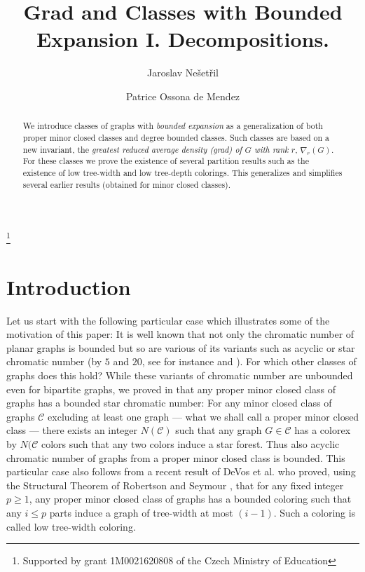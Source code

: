 \documentclass[a4paper]{amsart}
\theoremstyle{definition}
\theoremstyle{remark}
\newcommand{\rdens}[1]{\nabla_{#1}}
\begin{document}
\title{Grad  and Classes with Bounded Expansion I. Decompositions.}
\author{Jaroslav Ne\v
  set\v ril}
\thanks{Supported by grant 1M0021620808 of the Czech Ministry of Education}
\address{Department of Applied Mathematics\\
  and\\
  Institute of Theoretical Computer Science (ITI)\\
  Charles University\\
  Malostransk\' e n\' am.25, 11800 Praha 1\\
  Czech Republic}  \author{Patrice
  Ossona de Mendez}
\address{Centre d'Analyse et de Math\'ematiques Sociales\\
  CNRS, UMR 8557\\
  54 Bd Raspail, 75006 Paris\\
  France} 
\begin{abstract}
We introduce classes of graphs with {\em bounded expansion} as a
generalization of both proper minor closed classes and degree bounded
classes. Such classes are based on a new invariant, the
{\em greatest reduced average density (grad) of $G$ with rank $r$},
$\rdens{r}(G)$. For these classes we prove the existence of several
partition results such as the existence of low tree-width and low
tree-depth colorings. This generalizes and simplifies several earlier
results (obtained for minor closed classes). 
\end{abstract}

\maketitle
\section{Introduction}
\label{sec:intro}
Let us start with the following particular case which illustrates some
of the motivation of this paper:
It is well known that not only the chromatic number of
planar graphs is bounded
but so are various of its variants such as acyclic or star chromatic number
(by $5$ and $20$, see for instance \cite{AMS} and \cite{albertson04}). For
which other classes of graphs does this hold?  While these variants 
of chromatic number are unbounded even 
for bipartite graphs, we proved
in \cite{Taxi_jcolor} that any proper minor closed class of graphs
has a bounded star chromatic number:
For any minor closed class of graphs $\mathcal C$ excluding at least one
graph --- what we shall call a proper minor closed class ---
there exists an integer $N(\mathcal C)$ such that any graph
$G\in\mathcal C$ has a colorex by $N(\mathcal C$ colors such that any two colors
induce a star forest. Thus also acyclic chromatic number of graphs from a 
proper minor closed class is bounded. This particular case  also 
follows from a 
 recent result of DeVos et al.
 \cite{2tw} who  proved, using the
Structural Theorem of Robertson and Seymour \cite{GM16}, that for any fixed
integer $p\geq 1$, any proper
minor closed class of graphs has a bounded coloring such that any
$i\leq p$ parts induce a graph of tree-width at most $(i-1)$. 
Such a coloring is called low tree-width coloring.
\end{document}
